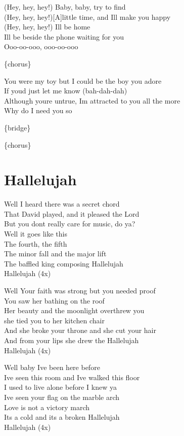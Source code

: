 \documentclass[
  letterpaper,
  twoside=false]{scrbook}
\begin{document}
(Hey, hey, hey!) Baby, baby, try to find\\
(Hey, hey, hey!){[}A{]}little time, and I\textquotesingle ll make you
happy\\
(Hey, hey, hey!) I\textquotesingle ll be home\\
I\textquotesingle ll be beside the phone waiting for you\\
Ooo-oo-ooo, ooo-oo-ooo

\{chorus\}

You were my toy but I could be the boy you adore\\
If you\textquotesingle d just let me know (bah-dah-dah)\\
Although you\textquotesingle re untrue, I\textquotesingle m attracted to
you all the more\\
Why do I need you so

\{bridge\}

\{chorus\}

\hypertarget{hallelujah}{%
\chapter{Hallelujah}\label{hallelujah}}

Well I heard there was a secret chord\\
That David played, and it pleased the Lord\\
But you don\textquotesingle t really care for music, do ya?\\
Well it goes like this\\
The fourth, the fifth\\
The minor fall and the major lift\\
The baffled king composing Hallelujah\\
Hallelujah (4x)

Well Your faith was strong but you needed proof\\
You saw her bathing on the roof\\
Her beauty and the moonlight overthrew you\\
she tied you to her kitchen chair\\
And she broke your throne and she cut your hair\\
And from your lips she drew the Hallelujah\\
Hallelujah (4x)

Well baby I\textquotesingle ve been here before\\
I\textquotesingle ve seen this room and I\textquotesingle ve walked this
floor\\
I used to live alone before I knew ya\\
I\textquotesingle ve seen your flag on the marble arch\\
Love is not a victory march\\
It\textquotesingle s a cold and it\textquotesingle s a broken
Hallelujah\\
Hallelujah (4x)
\end{document}
